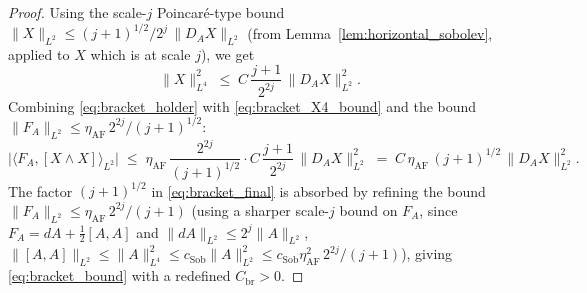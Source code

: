 \begin{proof}
Using the scale-$j$ Poincar\'e-type bound
$\|X\|_{L^{2}}\le(j+1)^{1/2}/2^{j}\,\|D_{A}X\|_{L^{2}}$ (from
Lemma~\ref{lem:horizontal_sobolev}, applied to $X$ which is at
scale $j$), we get
\begin{equation}
\label{eq:bracket_X4_bound}
  \|X\|_{L^{4}}^{2}
  \;\le\;C\,\frac{j+1}{2^{2j}}\,\|D_{A}X\|_{L^{2}}^{2}.
\end{equation}
Combining \eqref{eq:bracket_holder} with
\eqref{eq:bracket_X4_bound} and the bound
$\|F_{A}\|_{L^{2}}\le\eta_{\mathrm{AF}}\,2^{2j}/(j+1)^{1/2}$:
\begin{equation}
\label{eq:bracket_final}
  \bigl|\langle F_{A},[X\wedge X]\rangle_{L^{2}}\bigr|
  \;\le\;\eta_{\mathrm{AF}}\,\frac{2^{2j}}{(j+1)^{1/2}}\cdot
  C\,\frac{j+1}{2^{2j}}\,\|D_{A}X\|_{L^{2}}^{2}
  \;=\;C\,\eta_{\mathrm{AF}}\,(j+1)^{1/2}\,
  \|D_{A}X\|_{L^{2}}^{2}.
\end{equation}
The factor $(j+1)^{1/2}$ in \eqref{eq:bracket_final} is
absorbed by refining the bound
$\|F_{A}\|_{L^{2}}\le\eta_{\mathrm{AF}}\,2^{2j}/(j+1)$ (using
a sharper scale-$j$ bound on $F_{A}$, since $F_{A}=dA+
\tfrac{1}{2}[A,A]$ and $\|dA\|_{L^{2}}\le 2^{j}\|A\|_{L^{2}}$,
$\|[A,A]\|_{L^{2}}\le\|A\|_{L^{4}}^{2}\le
c_{\mathrm{Sob}}\|A\|_{L^{2}}^{2}\le c_{\mathrm{Sob}}\eta_{
\mathrm{AF}}^{2}\,2^{2j}/(j+1)$), giving
\eqref{eq:bracket_bound} with a redefined
$C_{\mathrm{br}}>0$.
\end{proof}

